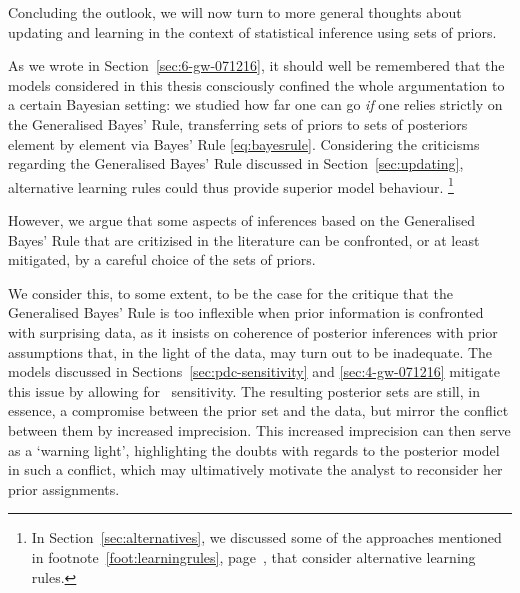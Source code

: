 \medskip

Concluding the outlook, we will now turn to more general thoughts about updating and learning
in the context of statistical inference using sets of priors.


As we wrote in Section~\ref{sec:6-gw-071216},
it should well be remembered that the models considered in this thesis
consciously confined the whole argumentation to a certain Bayesian setting:
we studied how far one can go \emph{if} one relies strictly on the Generalised Bayes' Rule,
transferring sets of priors to sets of posteriors element by element via Bayes' Rule \eqref{eq:bayesrule}.
Considering the criticisms regarding the Generalised Bayes' Rule discussed in Section~\ref{sec:updating},
alternative learning rules could thus provide superior model behaviour.%
\footnote{In Section~\ref{sec:alternatives}, we discussed some of the approaches
mentioned in footnote~\ref{foot:learningrules}, page~\pageref{foot:learningrules},
that consider alternative learning rules.}

However, we argue that some aspects of inferences based on the Generalised Bayes' Rule that are critizised
in the literature
can be confronted, or at least mitigated, by a careful choice of the sets of priors.

We consider this, to some extent, to be the case for the critique that 
the Generalised Bayes' Rule is too inflexible when prior information is confronted with surprising data,
as it insists on coherence of posterior inferences with prior assumptions that,
in the light of the data, may turn out to be inadequate.
The models discussed in Sections~\ref{sec:pdc-sensitivity} and \ref{sec:4-gw-071216}
mitigate this issue by allowing for \pdc\ sensitivity.
The resulting posterior sets are still, in essence, a compromise between the prior set and the data,
but mirror the conflict between them by increased imprecision.
This increased imprecision can then serve as a `warning light',
highlighting the doubts with regards to the posterior model in such a conflict,
which may ultimatively motivate the analyst to reconsider her prior assignments.

